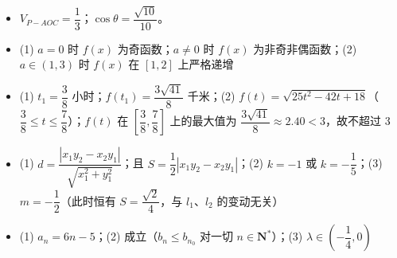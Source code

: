 \begin{itemize}[leftmargin=2.6em]
  \item[\textbf{19.}] \(V_{P-AOC}=\dfrac{1}{3}\)；\(\cos\theta=\dfrac{\sqrt{10}}{10}\)。
  \item[\textbf{20.}] (1) \(a=0\) 时 \(f(x)\) 为奇函数；\(a\neq0\) 时 \(f(x)\) 为非奇非偶函数；(2) \(a\in(1,3)\) 时 \(f(x)\) 在 \([1,2]\) 上严格递增
  \item[\textbf{21.}] (1) \(t_{1}=\dfrac{3}{8}\) 小时；\(f(t_{1})=\dfrac{3\sqrt{41}}{8}\) 千米；(2) \(f(t)=\sqrt{25t^{2}-42t+18}\)（\(\dfrac{3}{8}\leqslant t\leqslant\dfrac{7}{8}\)）；\(f(t)\) 在 \(\left[\dfrac{3}{8},\dfrac{7}{8}\right]\) 上的最大值为 \(\dfrac{3\sqrt{41}}{8}\approx 2.40<3\)，故不超过 3
  \item[\textbf{22.}] (1) \(d=\dfrac{|x_{1}y_{2}-x_{2}y_{1}|}{\sqrt{x_{1}^{2}+y_{1}^{2}}}\)；且 \(S=\dfrac{1}{2}|x_{1}y_{2}-x_{2}y_{1}|\)；(2) \(k=-1\) 或 \(k=-\dfrac{1}{5}\)；(3) \(m=-\dfrac{1}{2}\)（此时恒有 \(S=\dfrac{\sqrt{2}}{4}\)，与 \(l_{1}\)、\(l_{2}\) 的变动无关）
  \item[\textbf{23.}] (1) \(a_{n}=6n-5\)；(2) 成立（\(b_{n}\leqslant b_{n_{0}}\) 对一切 \(n\in\mathbf{N}^{*}\)）；(3) \(\lambda\in\left(-\dfrac{1}{4},0\right)\)
\end{itemize}
